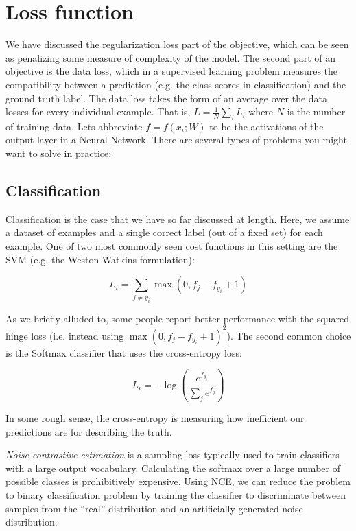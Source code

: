 \chapter{Loss function}

We have discussed the regularization loss part of the objective, which can be seen as penalizing some measure of complexity of the model. The second part of an objective is the data loss, which in a supervised learning problem measures the compatibility between a prediction (e.g. the class scores in classification) and the ground truth label. The data loss takes the form of an average over the data losses for every individual example. That is, $L = \frac{1}{N} \sum_i L_i$ where $N$ is the number of training data. Lets abbreviate $f = f(x_i; W)$ to be the activations of the output layer in a Neural Network. There are several types of problems you might want to solve in practice:

\section*{Classification}

Classification is the case that we have so far discussed at length. Here, we assume a dataset of examples and a single correct label (out of a fixed set) for each example. One of two most commonly seen cost functions in this setting are the SVM (e.g. the Weston Watkins formulation):

\begin{equation}
L_i = \sum_{j\neq y_i} \max(0, f_j - f_{y_i} + 1)
\end{equation}

As we briefly alluded to, some people report better performance with the squared hinge loss (i.e. instead using $\max(0, f_j - f_{y_i} + 1)^2$). The second common choice is the Softmax classifier that uses the cross-entropy loss:

\begin{equation}
L_i = -\log\left(\frac{e^{f_{y_i}}}{ \sum_j e^{f_j} }\right)
\end{equation}

In some rough sense, the cross-entropy is measuring how inefficient our predictions are for describing the truth.

\textit{Noise-contrastive estimation} is a sampling loss typically used to train classifiers with a large output vocabulary. Calculating the softmax over a large number of possible classes is prohibitively expensive. Using NCE, we can reduce the problem to binary classification problem by training the classifier to discriminate between samples from the “real” distribution and an artificially generated noise distribution.

